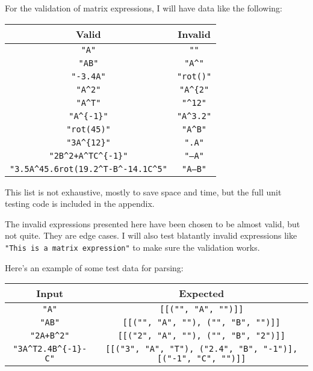 \documentclass[../main.tex]{subfiles}
\begin{document}
For the validation of matrix expressions, I will have data like the following:
\begin{center}
\begin{tabular}{|c|c|}
\hline
Valid & Invalid\\
\hline
\texttt{"A"} & \texttt{""}\\
\hline
\texttt{"AB"} & \texttt{"A\textasciicircum"}\\
\hline
\texttt{"-3.4A"} & \texttt{"rot()"}\\
\hline
\texttt{"A\textasciicircum2"} & \texttt{"A\textasciicircum\{2"}\\
\hline
\texttt{"A\textasciicircum T"} & \texttt{"\textasciicircum12"}\\
\hline
\texttt{"A\textasciicircum\{-1\}"} & \texttt{"A\textasciicircum3.2"}\\
\hline
\texttt{"rot(45)"} & \texttt{"A\textasciicircum B"}\\
\hline
\texttt{"3A\textasciicircum\{12\}"} & \texttt{".A"}\\
\hline
\texttt{"2B\textasciicircum2+A\textasciicircum TC\textasciicircum\{-1\}"} & \texttt{"--A"}\\
\hline
\texttt{"3.5A\textasciicircum{4}5.6rot(19.2\textasciicircum T-B\textasciicircum{-1}4.1C\textasciicircum5"} & \texttt{"A--B"}\\
\hline
\end{tabular}
\end{center}

This list is not exhaustive, mostly to save space and time, but the full unit testing code is included in the appendix.

The invalid expressions presented here have been chosen to be almost valid, but not quite. They are edge cases. I will also test blatantly invalid expressions like \texttt{"This is a matrix expression"} to make sure the validation works.

Here's an example of some test data for parsing:\vspace{-1em}
\begin{center}
\begin{tabular}{|c|c|}
\hline
Input & Expected\\
\hline
\texttt{"A"} & \texttt{[[("", "A", "")]]}\\
\hline
\texttt{"AB"} & \texttt{[[("", "A", ""), ("", "B", "")]]}\\
\hline
\texttt{"2A+B\textasciicircum2"} & \texttt{[[("2", "A", ""), ("", "B", "2")]]}\\
\hline
\texttt{"3A\textasciicircum T2.4B\textasciicircum\{-1\}-C"} & \texttt{[[("3", "A", "T"), ("2.4", "B", "-1")], [("-1", "C", "")]]}\\
\hline
\end{tabular}
\end{center}
\end{document}

